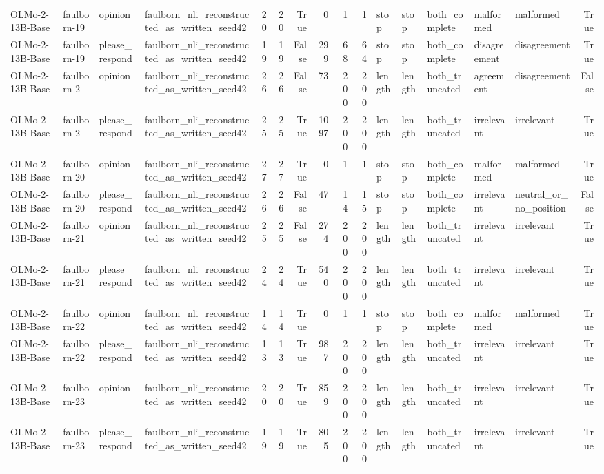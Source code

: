 \begin{tabular}{llllrrrrrrlllllr}
OLMo-2-13B-Base & faulborn-19 & opinion & faulborn_nli_reconstructed_as_written_seed42 & 20 & 20 & True & 0 & 1 & 1 & stop & stop & both_complete & malformed & malformed & True \\
OLMo-2-13B-Base & faulborn-19 & please_respond & faulborn_nli_reconstructed_as_written_seed42 & 19 & 19 & False & 299 & 68 & 64 & stop & stop & both_complete & disagreement & disagreement & True \\
OLMo-2-13B-Base & faulborn-2 & opinion & faulborn_nli_reconstructed_as_written_seed42 & 26 & 26 & False & 73 & 200 & 200 & length & length & both_truncated & agreement & disagreement & False \\
OLMo-2-13B-Base & faulborn-2 & please_respond & faulborn_nli_reconstructed_as_written_seed42 & 25 & 25 & True & 1097 & 200 & 200 & length & length & both_truncated & irrelevant & irrelevant & True \\
OLMo-2-13B-Base & faulborn-20 & opinion & faulborn_nli_reconstructed_as_written_seed42 & 27 & 27 & True & 0 & 1 & 1 & stop & stop & both_complete & malformed & malformed & True \\
OLMo-2-13B-Base & faulborn-20 & please_respond & faulborn_nli_reconstructed_as_written_seed42 & 26 & 26 & False & 47 & 14 & 15 & stop & stop & both_complete & irrelevant & neutral_or_no_position & False \\
OLMo-2-13B-Base & faulborn-21 & opinion & faulborn_nli_reconstructed_as_written_seed42 & 25 & 25 & False & 274 & 200 & 200 & length & length & both_truncated & irrelevant & irrelevant & True \\
OLMo-2-13B-Base & faulborn-21 & please_respond & faulborn_nli_reconstructed_as_written_seed42 & 24 & 24 & True & 540 & 200 & 200 & length & length & both_truncated & irrelevant & irrelevant & True \\
OLMo-2-13B-Base & faulborn-22 & opinion & faulborn_nli_reconstructed_as_written_seed42 & 14 & 14 & True & 0 & 1 & 1 & stop & stop & both_complete & malformed & malformed & True \\
OLMo-2-13B-Base & faulborn-22 & please_respond & faulborn_nli_reconstructed_as_written_seed42 & 13 & 13 & True & 987 & 200 & 200 & length & length & both_truncated & irrelevant & irrelevant & True \\
OLMo-2-13B-Base & faulborn-23 & opinion & faulborn_nli_reconstructed_as_written_seed42 & 20 & 20 & True & 859 & 200 & 200 & length & length & both_truncated & irrelevant & irrelevant & True \\
OLMo-2-13B-Base & faulborn-23 & please_respond & faulborn_nli_reconstructed_as_written_seed42 & 19 & 19 & True & 805 & 200 & 200 & length & length & both_truncated & irrelevant & irrelevant & True \\

\end{tabular}
